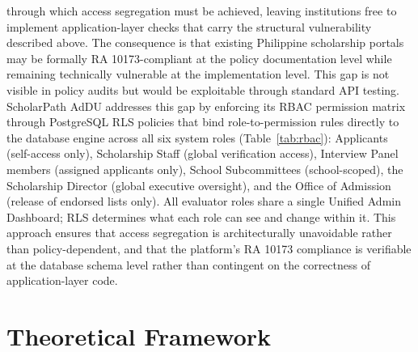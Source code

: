 through which access segregation must be achieved, leaving institutions free to implement application-layer checks that carry the structural vulnerability described above. The consequence is that existing Philippine scholarship portals may be formally RA 10173-compliant at the policy documentation level while remaining technically vulnerable at the implementation level. This gap is not visible in policy audits but would be exploitable through standard API testing. ScholarPath AdDU addresses this gap by enforcing its RBAC permission matrix through PostgreSQL RLS policies that bind role-to-permission rules directly to the database engine across all six system roles (Table~\ref{tab:rbac}): Applicants (self-access only), Scholarship Staff (global verification access), Interview Panel members (assigned applicants only), School Subcommittees (school-scoped), the Scholarship Director (global executive oversight), and the Office of Admission (release of endorsed lists only). All evaluator roles share a single Unified Admin Dashboard; RLS determines what each role can see and change within it. This approach ensures that access segregation is architecturally unavoidable rather than policy-dependent, and that the platform's RA 10173 compliance is verifiable at the database schema level rather than contingent on the correctness of application-layer code.

\section{Theoretical Framework}

